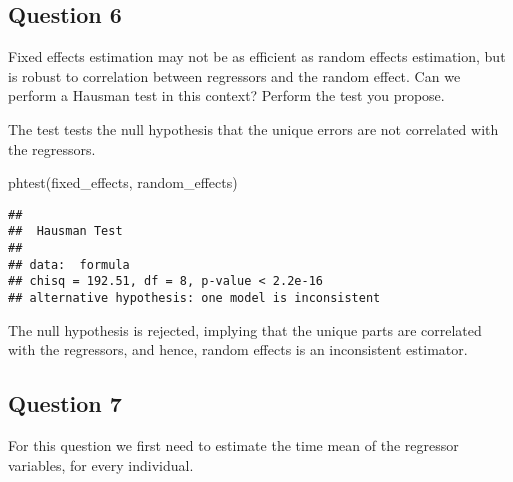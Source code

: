\documentclass[
]{article}
\newenvironment{Shaded}{\begin{snugshade}}{\end{snugshade}}
\newcommand{\FunctionTok}[1]{\textcolor[rgb]{0.00,0.00,0.00}{#1}}
\newcommand{\NormalTok}[1]{#1}
\begin{document}
\clearpage

\hypertarget{question-6}{%
\subsection{Question 6}\label{question-6}}

Fixed effects estimation may not be as efficient as random effects
estimation, but is robust to correlation between regressors and the
random effect. Can we perform a Hausman test in this context? Perform
the test you propose.

The test tests the null hypothesis that the unique errors are not
correlated with the regressors.

\begin{Shaded}
\begin{Highlighting}[]
\FunctionTok{phtest}\NormalTok{(fixed\_effects, random\_effects)}
\end{Highlighting}
\end{Shaded}

\begin{verbatim}
## 
##  Hausman Test
## 
## data:  formula
## chisq = 192.51, df = 8, p-value < 2.2e-16
## alternative hypothesis: one model is inconsistent
\end{verbatim}

The null hypothesis is rejected, implying that the unique parts are
correlated with the regressors, and hence, random effects is an
inconsistent estimator.

\hypertarget{question-7}{%
\subsection{Question 7}\label{question-7}}

For this question we first need to estimate the time mean of the
regressor variables, for every individual.
\end{document}
